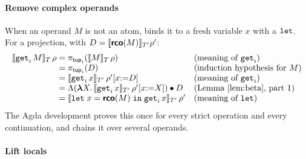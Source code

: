 \paragraph{Remove complex operands}

When an operand $M$ is not an atom, 
binds it to a fresh variable $x$ with a $\mathtt{let}$. For a projection,
with $D = \llbracket \textsf{\bfseries rco}(M) \rrbracket_{T'}\rho'$:
{\small
\[
\begin{array}{@{}r@{\;}c@{\;}l@{\quad}l@{}}
  \den{\kw{get}_i\,M}_T\,\rho & = & \pi_{\mathsf{tup}_i}(\den{M}_T\,\rho) & \text{(meaning of $\kw{get}_i$)}\\
    & = & \pi_{\mathsf{tup}_i}(D) & \text{(induction hypothesis for $M$)}\\
    & = & \den{\kw{get}_i\,x}_{T'}\,\rho'[x{:=}D] & \text{(meaning of $\kw{get}_i$)}\\
    & = & \Lambda(\mlam{X} \den{\kw{get}_i\,x}_{T'}\,\rho'[x{:=}X]) \app D & \text{(Lemma~\ref{lem:beta}, part 1)}\\
    & = & \den{\kw{let}\;x = \pass{rco}(M)\;\kw{in}\;\kw{get}_i\,x}_{T'}\,\rho' & \text{(meaning of $\kw{let}$)}
\end{array}
\]}
The Agda development proves this once for every strict operation and every
continuation, and chains it over several operands.

\paragraph{Lift locals}

